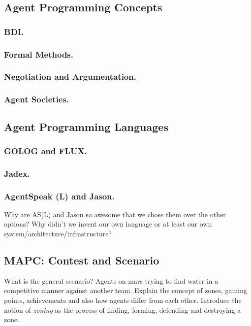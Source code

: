\subsection{Agent Programming Concepts}
\subsubsection{BDI.}
\subsubsection{Formal Methods.}


\subsubsection{Negotiation and Argumentation.}
\subsubsection{Agent Societies.}
\subsection{Agent Programming Languages}
\subsubsection{GOLOG and FLUX.}
\subsubsection{Jadex.}
\subsubsection{AgentSpeak (L) and Jason.}
Why are AS(L) and Jason so awesome that we chose them over the other options? Why didn't we invent our own language or at least our own system/architecture/infrastructure?
\subsection{MAPC: Contest and Scenario}
What is the general scenario? Agents on mars trying to find water in a competitive manner against another team. Explain the concept of zones, gaining points, achievements and also how agents differ from each other. Introduce the notion of \emph{zoning} as the process of finding, forming, defending and destroying a zone.
